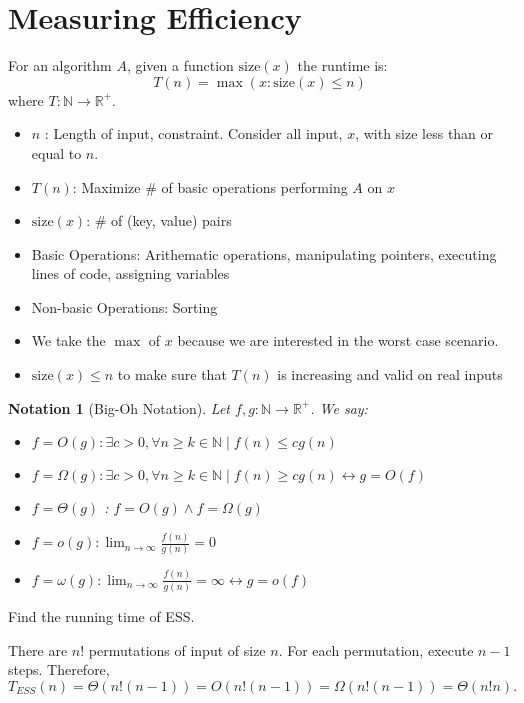 \documentclass[11pt]{scrartcl}
\theoremstyle{dotlessP}
\theoremstyle{dotlessN}
\newtheorem{notation}[theorem]{Notation}
\newcommand{\reals}{\mathbb{R}} %
\newcommand{\nats}{\mathbb{N}}
\begin{document}
\section{Measuring Efficiency}
\begin{definition}
	For an algorithm $A$, given a function $\text{size}(x)$ the runtime is:
	\[
		T(n) = \max(x : \text{size}(x) \leq n)
	\]
	where $T: \nats \to \reals^+$.
\end{definition}
\begin{itemize}
	\item $n$ : Length of input, constraint. Consider all input, $x$, with size less than or equal to $n$.
	\item $T(n)$: Maximize \# of basic operations performing $A$ on $x$
	\item $\text{size}(x)$: \# of (key, value) pairs 
	\item Basic Operations: Arithematic operations, manipulating pointers, executing lines of code, assigning variables
	\item Non-basic Operations: Sorting
	\item We take the $\max$ of $x$ because we are interested in the worst case scenario.
	\item  $\text{size}(x) \leq n$ to make sure that $T(n)$ is increasing and valid on real inputs
\end{itemize}
\begin{notation}
	[Big-Oh Notation]	
	Let $f,g: \nats \to \reals^+$. We say:
	\begin{itemize}
		\item $f = O(g) :  \exists c > 0, \forall n \geq k \in \nats \mid f(n) \leq cg(n) $
		\item  $f = \Omega(g) : \exists c > 0, \forall n \geq k \in \nats \mid f(n) \geq cg(n) \leftrightarrow g=O(f)$
		\item $f = \Theta(g)$ :  $f=O(g) \land f=\Omega(g)$
		\item $f = o(g) : \displaystyle\lim_{n \to \infty} \frac{f(n)}{g(n)} = 0$
		\item $f = \omega(g) : \displaystyle\lim_{n \to \infty} \frac{f(n)}{g(n)} = \infty \leftrightarrow g = o(f)$
	\end{itemize}
\end{notation}
\begin{example}
	Find the running time of ESS.
\end{example}
\begin{soln}
	There are $n!$ permutations of input of size $n$. For each permutation, execute $n-1$ steps. Therefore, $T_{ESS}(n) = \Theta(n!(n-1)) = O(n!(n-1)) = \Omega(n!(n-1)) = \Theta(n!n).$
\end{soln}
\end{document}
